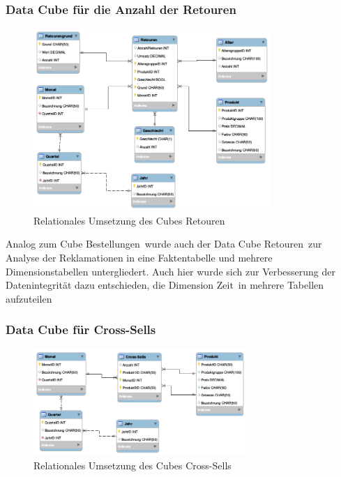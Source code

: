 \subsubsection{Data Cube für die Anzahl der Retouren}
\begin{figure}[htbp] 
    \centering
       \includegraphics[width=0.8\textwidth]{phase2/dwh-retouren.png}
    \caption{Relationales Umsetzung des Cubes \glqq Retouren\grqq}
    \label{fig:retouren}
\end{figure}  
Analog zum Cube \glqq Bestellungen\grqq ~wurde auch der Data Cube \glqq Retouren\grqq ~zur Analyse der Reklamationen in eine Faktentabelle und mehrere Dimensionstabellen untergliedert. Auch hier wurde sich zur Verbesserung der Datenintegrität dazu entschieden, die Dimension \glqq Zeit\grqq ~in mehrere Tabellen aufzuteilen 
  
  
\subsubsection{Data Cube für Cross-Sells}
\begin{figure}[htbp] 
    \centering
       \includegraphics[width=0.72\textwidth]{phase2/dwh-cross.png}
    \caption{Relationales Umsetzung des Cubes \glqq Cross-Sells\grqq}
    \label{fig:bestellungen}
  \end{figure}  
  
